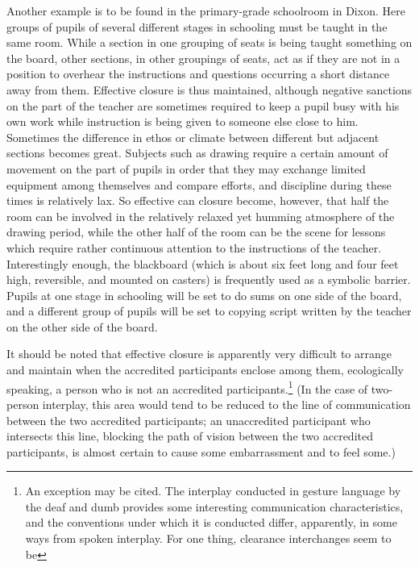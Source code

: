 \documentclass[twoside,symmetric,nobib,justified]{tufte-book}
\begin{document}
Another example is to be found in the primary-grade schoolroom in Dixon.
Here groups of pupils of several different stages in schooling must be
taught in the same room. While a section in one grouping of seats is
being taught something on the board, other sections, in other groupings
of seats, act as if they are not in a position to overhear the
instructions and questions occurring a short distance away from them.
Effective closure is thus maintained, although negative sanctions on the
part of the teacher are sometimes required to keep a pupil busy with his
own work while instruction is being given to someone else close to him.
Sometimes the difference in ethos or climate between different but
adjacent sections becomes great. Subjects such as drawing require a
certain amount of movement on the part of pupils in order that they may
exchange limited equipment among themselves and compare efforts, and
discipline during these times is relatively lax. So effective can
closure become, however, that half the room can be involved in the
relatively relaxed yet humming atmosphere of the drawing period, while
the other half of the room can be the scene for lessons which require
rather continuous attention to the instructions of the teacher.
Interestingly enough, the blackboard (which is about six feet long and
four feet high, reversible, and mounted on casters) is frequently used
as a symbolic barrier. Pupils at one stage in schooling will be set to
do sums on one side of the board, and a different group of pupils will
be set to copying script written by the teacher on the other side of the
board.

It should be noted that effective closure is apparently very difficult
to arrange and maintain when the accredited participants enclose among
them, ecologically speaking, a person who is not an accredited
participants.\footnote{An exception may be cited. The interplay
  conducted in gesture language by the deaf and dumb provides some
  interesting communication characteristics, and the conventions under
  which it is conducted differ, apparently, in some ways from spoken
  interplay. For one thing, clearance interchanges seem to be} (In the case
of two-person interplay, this area would tend to be reduced to the line
of communication between the two accredited participants; an
unaccredited participant who intersects this line, blocking the path of
vision between the two accredited participants, is almost certain to
cause some embarrassment and to feel some.)
\end{document}
